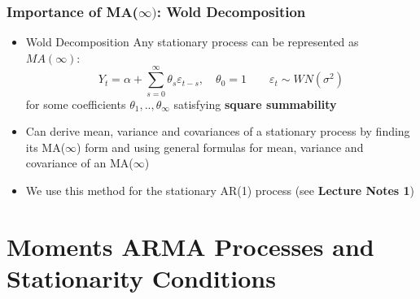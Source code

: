 \documentclass{beamer}
\begin{document}
	\begin{frame}
		
		\frametitle{Importance of MA($\infty)$: Wold Decomposition}
		
		\begin{itemize}
			\item[] \begin{mytheo*}{Wold Decomposition}
				Any  stationary process can be
				represented as $MA(\infty ):$
				\begin{equation*}
				Y_{t}=\alpha +\sum_{s=0}^{\infty }\theta _{s}\varepsilon _{t-s},\quad \theta
				_{0}=1 \qquad \varepsilon_t \sim WN(\sigma^2)
				\end{equation*}%
				for some coefficients $\theta_1,..,\theta_{\infty}$ satisfying \textbf{square summability} \end{mytheo*}
			
			\pause
			
			\vspace{20pt}
			\item[]  Can derive mean, variance and covariances of a stationary process by finding its MA($\infty$) form and using general formulas for mean, variance and covariance of an MA($\infty$)
			
			
			\vspace{20pt}
			\item[] We use this method for the stationary AR(1) process (see \textbf{Lecture Notes 1})
		\end{itemize}
		
	\end{frame}
		

			
			
		

		
			
			
			
			
			\section{Moments ARMA Processes and Stationarity Conditions}
			
\end{document}
